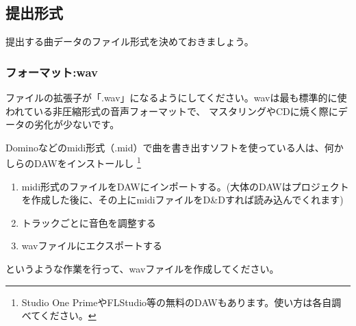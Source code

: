 \documentclass[11pt,a4paper]{jsarticle}
\begin{document}
        \subsection{提出形式}
            提出する曲データのファイル形式を決めておきましょう。
            \subsubsection{フォーマット:wav}
                ファイルの拡張子が「.wav」になるようにしてください。wavは最も標準的に使われている非圧縮形式の音声フォーマットで、
                マスタリングやCDに焼く際にデータの劣化が少ないです。

                Dominoなどのmidi形式（.mid）で曲を書き出すソフトを使っている人は、何かしらのDAWをインストールし
                \footnote{Studio One PrimeやFLStudio等の無料のDAWもあります。使い方は各自調べてください。}
                \begin{enumerate}
                    \item midi形式のファイルをDAWにインポートする。(大体のDAWはプロジェクトを作成した後に、その上にmidiファイルをD\&Dすれば読み込んでくれます)
                    \item トラックごとに音色を調整する
                    \item wavファイルにエクスポートする
                \end{enumerate}
                というような作業を行って、wavファイルを作成してください。
\end{document}
